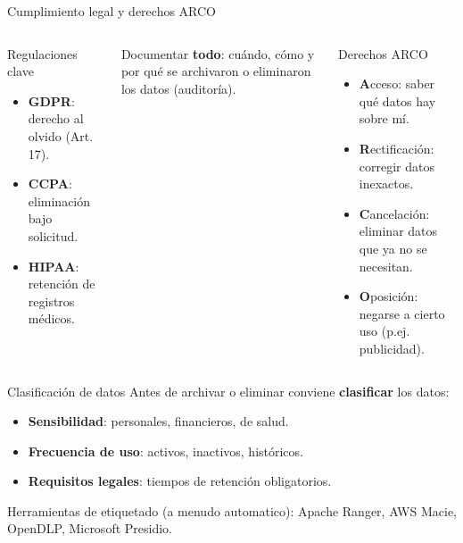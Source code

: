 \documentclass[aspectratio=169]{beamer}
\begin{document}
\begin{frame}{Cumplimiento legal y derechos ARCO}
  \begin{columns}[t]
      \begin{block}{Regulaciones clave}
        \begin{itemize}
          \item \textbf{GDPR}: derecho al olvido (Art. 17).
          \item \textbf{CCPA}: eliminaci\'on bajo solicitud.
          \item \textbf{HIPAA}: retenci\'on de registros m\'edicos.
        \end{itemize}
      \end{block}
      Documentar \textbf{todo}: cu\'ando, c\'omo y por qu\'e se archivaron o
      eliminaron los datos (auditor\'ia).
      \begin{block}{Derechos ARCO}
        \begin{itemize}
          \item \textbf{A}cceso: saber qu\'e datos hay sobre m\'i.
          \item \textbf{R}ectificaci\'on: corregir datos inexactos.
          \item \textbf{C}ancelaci\'on: eliminar datos que ya no se necesitan.
          \item \textbf{O}posici\'on: negarse a cierto uso (p.ej. publicidad).
        \end{itemize}
      \end{block}
  \end{columns}
\end{frame}

\begin{frame}{Clasificaci\'on de datos}
  Antes de archivar o eliminar conviene \textbf{clasificar} los datos:
  \begin{itemize}
    \item \textbf{Sensibilidad}: personales, financieros, de salud.
    \item \textbf{Frecuencia de uso}: activos, inactivos, hist\'oricos.
    \item \textbf{Requisitos legales}: tiempos de retenci\'on obligatorios.
  \end{itemize}
  \vspace{0.3em}
  Herramientas de etiquetado (a menudo automatico): Apache Ranger, AWS Macie,
  OpenDLP, Microsoft Presidio.
\end{frame}
\end{document}
